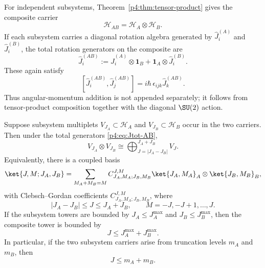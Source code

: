\documentclass[12pt,a4paper]{article}
\begin{document}
For independent subsystems, Theorem~\ref{p4:thm:tensor-product} gives the composite carrier
\begin{equation}
\label{p4:eq:Hab-spin}
\mathcal H_{AB}=\mathcal H_A\otimes\mathcal H_B.
\end{equation}
If each subsystem carries a diagonal rotation algebra generated by \(\hat J_i^{(A)}\) and \(\hat J_i^{(B)}\), the total rotation generators on the composite are
\begin{equation}
\label{p4:eq:Jtot-AB}
\hat J_i^{(AB)}:=\hat J_i^{(A)}\otimes \mathbf 1_B + \mathbf 1_A\otimes \hat J_i^{(B)}.
\end{equation}
These again satisfy
\[
[\hat J_i^{(AB)},\hat J_j^{(AB)}]=i\hbar\,\epsilon_{ijk}\hat J_k^{(AB)}.
\]
Thus angular-momentum addition is not appended separately; it follows from tensor-product composition together with the diagonal \(\SU(2)\) action.

\begin{theorem}
\label{p4:thm:finite-addition}
\leavevmode\par\noindent
Suppose subsystem multiplets \(V_{J_A}\subset\mathcal H_A\) and
\(V_{J_B}\subset\mathcal H_B\) occur in the two carriers.  Then under the total
generators \eqref{p4:eq:Jtot-AB},
\begin{equation}
\label{p4:eq:cg-composite}
V_{J_A}\otimes V_{J_B}
\cong
\bigoplus_{J=|J_A-J_B|}^{J_A+J_B} V_J.
\end{equation}
Equivalently, there is a coupled basis
\begin{equation}
\label{p4:eq:coupled-basis}
\ket{J,M;J_A,J_B}
=
\sum_{M_A+M_B=M}
C^{J,M}_{J_A,M_A;J_B,M_B}
\ket{J_A,M_A}_A\otimes\ket{J_B,M_B}_B,
\end{equation}
with Clebsch--Gordan coefficients \(C^{J,M}_{J_A,M_A;J_B,M_B}\), where
\begin{equation}
\label{p4:eq:composite-J-range}
|J_A-J_B|\le J\le J_A+J_B,
\qquad
M=-J,-J+1,\dots,J.
\end{equation}
If the subsystem towers are bounded by \(J_A\le J_A^{\max}\) and \(J_B\le J_B^{\max}\), then the composite tower is bounded by
\begin{equation}
\label{p4:eq:JAB-bound}
J\le J_A^{\max}+J_B^{\max}.
\end{equation}
In particular, if the two subsystem carriers arise from truncation levels \(m_A\) and \(m_B\), then
\begin{equation}
\label{p4:eq:mAB-bound}
J\le m_A+m_B.
\end{equation}
\end{theorem}
\end{document}
